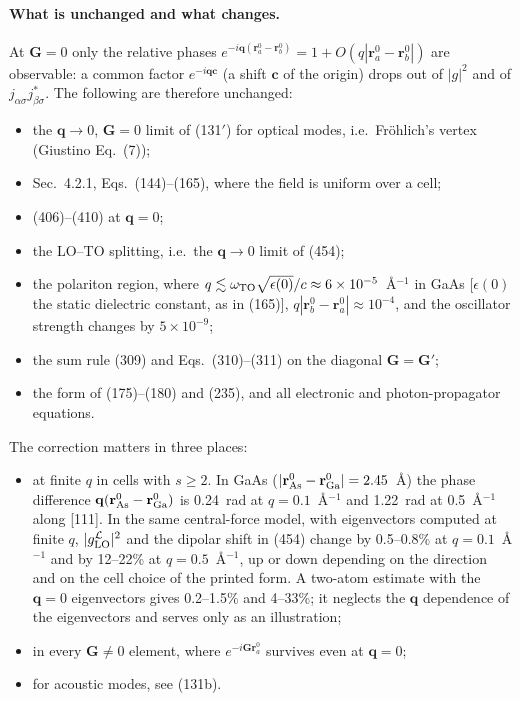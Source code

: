 \paragraph{What is unchanged and what changes.}
At $\mathbf G=0$ only the relative phases $e^{-i\mathbf q(\mathbf r^0_a-\mathbf r^0_b)}=1+O(q|\mathbf r^0_a-\mathbf r^0_b|)$ are observable: a common factor $e^{-i\mathbf q\mathbf c}$ (a shift $\mathbf c$ of the origin) drops out of $|g|^2$ and of $j_{\alpha\sigma}j^*_{\beta\sigma}$. The following are therefore unchanged:
\begin{itemize}
\item the $\mathbf q\to0$, $\mathbf G=0$ limit of (131$'$) for optical modes, i.e.\ Fr\"ohlich's vertex (Giustino Eq.~(7));
\item Sec.~4.2.1, Eqs.~(144)--(165), where the field is uniform over a cell;
\item (406)--(410) at $\mathbf q=0$;
\item the LO--TO splitting, i.e.\ the $\mathbf q\to0$ limit of (454);
\item the polariton region, where $q\lesssim\omega_{\rm TO}\sqrt{\epsilon(0)}/c\approx6\times10^{-5}$~\AA$^{-1}$ in GaAs [$\epsilon(0)$ the static dielectric constant, as in (165)], $q|\mathbf r^0_b-\mathbf r^0_a|\approx10^{-4}$, and the oscillator strength changes by $5\times10^{-9}$;
\item the sum rule (309) and Eqs.~(310)--(311) on the diagonal $\mathbf G=\mathbf G'$;
\item the form of (175)--(180) and (235), and all electronic and photon-propagator equations.
\end{itemize}
The correction matters in three places:
\begin{itemize}
\item at finite $q$ in cells with $s\ge2$. In GaAs ($|\mathbf r^0_{\rm As}-\mathbf r^0_{\rm Ga}|=2.45$~\AA) the phase difference $\mathbf q(\mathbf r^0_{\rm As}-\mathbf r^0_{\rm Ga})$ is 0.24~rad at $q=0.1$~\AA$^{-1}$ and 1.22~rad at 0.5~\AA$^{-1}$ along [111]. In the same central-force model, with eigenvectors computed at finite $q$, $|g^{\mathcal L}_{\rm LO}|^2$ and the dipolar shift in (454) change by 0.5--0.8\% at $q=0.1$~\AA$^{-1}$ and by 12--22\% at $q=0.5$~\AA$^{-1}$, up or down depending on the direction and on the cell choice of the printed form. A two-atom estimate with the $\mathbf q=0$ eigenvectors gives 0.2--1.5\% and 4--33\%; it neglects the $\mathbf q$ dependence of the eigenvectors and serves only as an illustration;
\item in every $\mathbf G\neq0$ element, where $e^{-i\mathbf G\mathbf r^0_a}$ survives even at $\mathbf q=0$;
\item for acoustic modes, see (131b).
\end{itemize}

